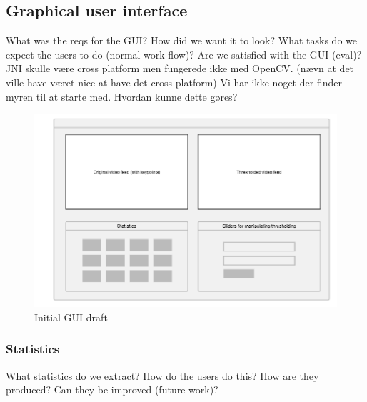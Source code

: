 
\subsection{Graphical user interface}

What was the reqs for the GUI?
How did we want it to look?
What tasks do we expect the users to do (normal work flow)?
Are we satisfied with the GUI (eval)?
JNI skulle være cross platform men fungerede ikke med OpenCV.
(nævn at det ville have været nice at have det cross platform)
Vi har ikke noget der finder myren til at starte med. Hvordan kunne dette gøres?

\begin{figure}[!ht]
    \centering
    \includegraphics[scale = 0.3]{img/termes_gui.png}
    \caption{Initial GUI draft}
\end{figure}

\subsubsection{Statistics}
What statistics do we extract?
How do the users do this?
How are they produced?
Can they be improved (future work)?
